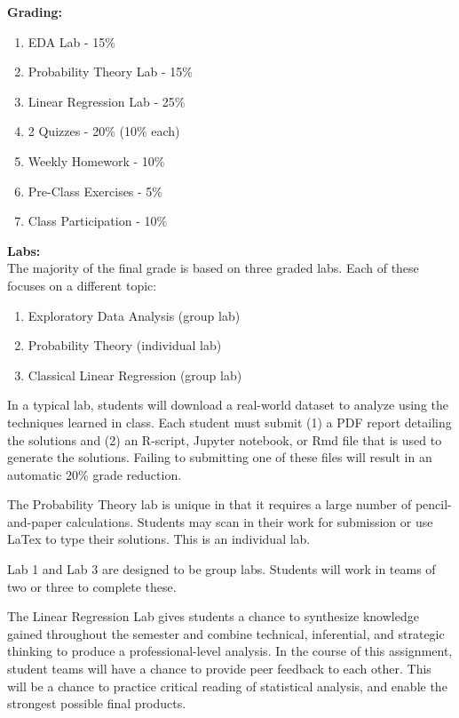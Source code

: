 \documentclass[11pt, a4paper]{article}
\begin{document}



\vspace*{.25in}
\noindent\textbf{Grading:} 
\begin{enumerate}
  \item EDA Lab - 15\%      
  \item Probability Theory Lab - 15\% 
  \item Linear Regression Lab - 25\% 
  \item 2 Quizzes - 20\% (10\% each)
  \item Weekly Homework - 10\%
  \item Pre-Class Exercises - 5\%
  \item Class Participation - 10\%
\end{enumerate}

\noindent \textbf{Labs:} \\
\noindent The majority of the final grade is based on three graded labs.  Each of these focuses on a different topic:
\begin{enumerate}
  \item Exploratory Data Analysis (group lab)
  \item Probability Theory (individual lab)
  \item Classical Linear Regression (group lab)
\end{enumerate}

In a typical lab, students will download a real-world dataset to analyze using the techniques learned in class.  Each student must submit (1) a PDF report detailing the solutions and (2) an R-script, Jupyter notebook, or Rmd file that is used to generate the solutions. Failing to submitting one of these files will result in an automatic $20\%$ grade reduction.

The Probability Theory lab is unique in that it requires a large number of pencil-and-paper calculations.  Students may scan in their work for submission or use LaTex to type their solutions.  This is an individual lab.

Lab 1 and Lab 3 are designed to be group labs.  Students will work in teams of two or three to complete these.

The Linear Regression Lab gives students a chance to synthesize knowledge gained throughout the semester and combine technical, inferential, and strategic thinking to produce a professional-level analysis.  In the course of this assignment, student teams will have a chance to provide peer feedback to each other.  This will be a chance to practice critical reading of statistical analysis, and enable the strongest possible final products. \\
\end{document}
